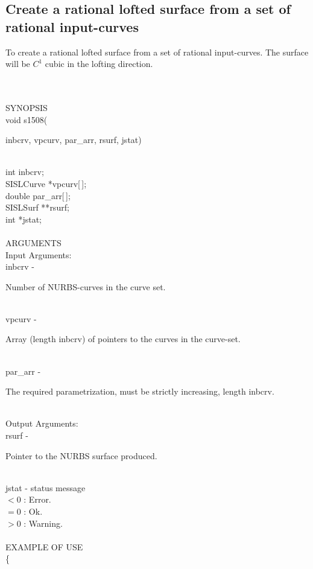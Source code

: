 \subsection{Create a rational lofted surface from a set of rational input-curves}
\begin{minipg1}
  To create a rational lofted surface from a set of rational input-curves. The surface will
  be $C^1$ cubic in the lofting direction.
\end{minipg1} \\ \\ 
SYNOPSIS\\
      \> void s1508(\begin{minipg3}
	   {\fov inbcrv}, {\fov vpcurv}, {\fov par\_arr}, {\fov rsurf}, {\fov jstat})
	       \end{minipg3}\\
               \>\> int \> {\fov inbcrv};\\
	       \>\> SISLCurve \> *{\fov vpcurv[\,]};\\
	       \>\> double \> {\fov par\_arr[\,]};\\
	       \>\> SISLSurf \> **{\fov rsurf};\\
	       \>\> int \> *{\fov jstat};\\
\\
ARGUMENTS\\
      \> Input Arguments:\\
      \>\> {\fov inbcrv} \> - \> \begin{minipg2}
	           Number of NURBS-curves in the curve set.
		                 \end{minipg2}\\
      \>\> {\fov vpcurv} \> - \> \begin{minipg2}
	           Array (length {\fov inbcrv}) of pointers to the curves in the curve-set.
		                 \end{minipg2}\\
      \>\> {\fov par\_arr} \> - \> \begin{minipg2}
	           The required parametrization, must be strictly increasing, 
		   length {\fov inbcrv}.
		                 \end{minipg2}\\

      \> Output Arguments: \\
      \>\> {\fov rsurf} \> - \> \begin{minipg2}
	           Pointer to the NURBS surface produced.
		                \end{minipg2}\\
      \>\> {\fov jstat} \> - \> status message \\
                 \>\>\>\>\>   $ < 0 $ : Error.\\
		 \>\>\>\>\>   $ = 0 $ : Ok. \\
		 \>\>\>\>\>   $ > 0 $ : Warning.\\
\\
EXAMPLE OF USE\\
               \>      \{ \\
	       
